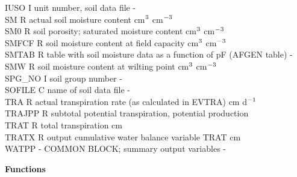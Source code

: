 \documentclass[11pt]{article}
\begin{document}
\begin{tabbing}
IUSO\> \> I\> unit number, soil data file\> \> \> \> \> \> \> -\\
SM\> \> R\> actual soil moisture content\> \> \> \> \> \> \> cm$^{{\rm 3}}$ cm$^{{\rm -3}}$\\
SM0\> \> R\> soil porosity; saturated moisture content\> \> \> \> \> \> \> cm$^{{\rm 3}}$ cm$^{{\rm -3}}$\\
SMFCF\> \> R\> soil moisture content at field capacity\> \> \> \> \> \> \> cm$^{{\rm 3}}$ cm$^{{\rm -3}}$\\
SMTAB\> \> R\> table with soil moisture data as a function of pF (AFGEN table)\> \> \> \> \> \> \> -\\
SMW\> \> R\> soil moisture content at wilting point\> \> \> \> \> \> \> cm$^{{\rm 3}}$ cm$^{{\rm -3}}$\\
SPG\_NO\> \> I\> soil group number\> \> \> \> \> \> \> -\\
SOFILE\> \> C\> name of soil data file\> \> \> \> \> \> \> -\\
TRA\> \> R\> actual transpiration rate (as calculated in EVTRA)\> \> \> \> \> \> \> cm d$^{{\rm -1}}$\\
TRAJPP\> \> R\> subtotal potential transpiration, potential production\\
TRAT\> \> R\> total transpiration\> \> \> \> \> \> \> cm\\
TRATX\> \> R\> output cumulative water balance variable TRAT\> \> \> \> \> \> \> cm\\
WATPP\> \> -\> COMMON BLOCK; summary output variables\> \> \> \> \> \> \> -
\end{tabbing}
\newpage
{\large {\bf Functions}}
\end{document}
